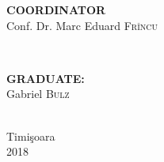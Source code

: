 \documentclass[12pt, a4paper]{report}
\begin{document}
\begin{titlepage}

\begin{minipage}{0.4\textwidth}
\begin{flushleft} \large
\textbf{COORDINATOR}\\
Conf. Dr. Marc Eduard \textsc{Fr\^incu} %
\end{flushleft}
\end{minipage}
~
\begin{minipage}{0.4\textwidth}
\begin{flushright} \large
\textbf{GRADUATE:} \\
Gabriel \textsc{Bulz} %
\end{flushright}
\end{minipage}\\[1cm]


\vfill
{\large Timi\c{s}oara \\2018}\\ %

 


\end{titlepage}


\end{document}
